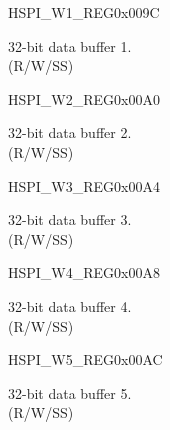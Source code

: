\begin{register}{H}{SPI\_W1\_REG}{0x009C}\label{regdesc:SPI3W1REG}
%
\regnewline%
\begin{regdesc}\begin{reglist}
\label{fielddesc:SPI3BUF1}\item [SPI\_BUF1] 32-bit data buffer 1. \\
(R/W/SS)
\end{reglist}\end{regdesc}
\end{register}


\begin{register}{H}{SPI\_W2\_REG}{0x00A0}\label{regdesc:SPI3W2REG}
%
\regnewline%
\begin{regdesc}\begin{reglist}
\label{fielddesc:SPI3BUF2}\item [SPI\_BUF2] 32-bit data buffer 2.\\
(R/W/SS)
\end{reglist}\end{regdesc}
\end{register}


\begin{register}{H}{SPI\_W3\_REG}{0x00A4}\label{regdesc:SPI3W3REG}
%
\regnewline%
\begin{regdesc}\begin{reglist}
\label{fielddesc:SPI3BUF3}\item [SPI\_BUF3] 32-bit data buffer 3. \\
(R/W/SS)
\end{reglist}\end{regdesc}
\end{register}


\begin{register}{H}{SPI\_W4\_REG}{0x00A8}\label{regdesc:SPI3W4REG}
%
\regnewline%
\begin{regdesc}\begin{reglist}
\label{fielddesc:SPI3BUF4}\item [SPI\_BUF4] 32-bit data buffer 4. \\
(R/W/SS)
\end{reglist}\end{regdesc}
\end{register}


\begin{register}{H}{SPI\_W5\_REG}{0x00AC}\label{regdesc:SPI3W5REG}
%
\regnewline%
\begin{regdesc}\begin{reglist}
\label{fielddesc:SPI3BUF5}\item [SPI\_BUF5] 32-bit data buffer 5. \\
(R/W/SS)
\end{reglist}\end{regdesc}
\end{register}


